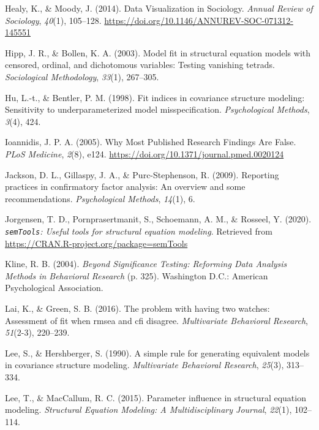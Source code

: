\documentclass[
  english,
  man]{apa6}
\newlength{\cslhangindent}
\newenvironment{cslreferences}%
  {\setlength{\parindent}{0pt}%
  \everypar{\setlength{\hangindent}{\cslhangindent}}\ignorespaces}%
  {\par}
\begin{document}
\begin{cslreferences}
\leavevmode\hypertarget{ref-Healy2014a}{}%
Healy, K., \& Moody, J. (2014). Data Visualization in Sociology. \emph{Annual Review of Sociology}, \emph{40}(1), 105--128. \url{https://doi.org/10.1146/ANNUREV-SOC-071312-145551}

\leavevmode\hypertarget{ref-hipp2003model}{}%
Hipp, J. R., \& Bollen, K. A. (2003). Model fit in structural equation models with censored, ordinal, and dichotomous variables: Testing vanishing tetrads. \emph{Sociological Methodology}, \emph{33}(1), 267--305.

\leavevmode\hypertarget{ref-hu1998fit}{}%
Hu, L.-t., \& Bentler, P. M. (1998). Fit indices in covariance structure modeling: Sensitivity to underparameterized model misspecification. \emph{Psychological Methods}, \emph{3}(4), 424.

\leavevmode\hypertarget{ref-Ioannidis2005}{}%
Ioannidis, J. P. A. (2005). Why Most Published Research Findings Are False. \emph{PLoS Medicine}, \emph{2}(8), e124. \url{https://doi.org/10.1371/journal.pmed.0020124}

\leavevmode\hypertarget{ref-jackson2009reporting}{}%
Jackson, D. L., Gillaspy, J. A., \& Purc-Stephenson, R. (2009). Reporting practices in confirmatory factor analysis: An overview and some recommendations. \emph{Psychological Methods}, \emph{14}(1), 6.

\leavevmode\hypertarget{ref-semtools}{}%
Jorgensen, T. D., Pornprasertmanit, S., Schoemann, A. M., \& Rosseel, Y. (2020). \emph{\texttt{semTools}: Useful tools for structural equation modeling}. Retrieved from \url{https://CRAN.R-project.org/package=semTools}

\leavevmode\hypertarget{ref-Kline2004}{}%
Kline, R. B. (2004). \emph{Beyond Significance Testing: Reforming Data Analysis Methods in Behavioral Research} (p. 325). Washington D.C.: American Psychological Association.

\leavevmode\hypertarget{ref-lai2016problem}{}%
Lai, K., \& Green, S. B. (2016). The problem with having two watches: Assessment of fit when rmsea and cfi disagree. \emph{Multivariate Behavioral Research}, \emph{51}(2-3), 220--239.

\leavevmode\hypertarget{ref-Lee90}{}%
Lee, S., \& Hershberger, S. (1990). A simple rule for generating equivalent models in covariance structure modeling. \emph{Multivariate Behavioral Research}, \emph{25}(3), 313--334.

\leavevmode\hypertarget{ref-lee2015parameter}{}%
Lee, T., \& MacCallum, R. C. (2015). Parameter influence in structural equation modeling. \emph{Structural Equation Modeling: A Multidisciplinary Journal}, \emph{22}(1), 102--114.


\end{cslreferences}
\end{document}
